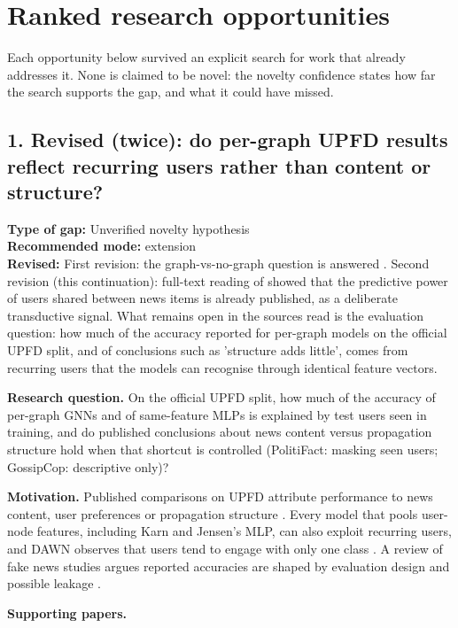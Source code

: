 \documentclass[11pt,a4paper]{article}
\begin{document}
\section{Ranked research opportunities}

Each opportunity below survived an explicit search for work that already addresses it. None is claimed to be novel: the novelty confidence states how far the search supports the gap, and what it could have missed.

\subsection{1. Revised (twice): do per-graph UPFD results reflect recurring users rather than content or structure?}
\textbf{Type of gap:} Unverified novelty hypothesis\\
\textbf{Recommended mode:} extension\\
\textbf{Revised:} First revision: the graph-vs-no-graph question is answered \cite{karn2025structure,dou2021upfd}. Second revision (this continuation): full-text reading of \cite{jeong2022hgfnd} showed that the predictive power of users shared between news items is already published, as a deliberate transductive signal. What remains open in the sources read is the evaluation question: how much of the accuracy reported for per-graph models on the official UPFD split, and of conclusions such as 'structure adds little', comes from recurring users that the models can recognise through identical feature vectors.

\textbf{Research question.} On the official UPFD split, how much of the accuracy of per-graph GNNs and of same-feature MLPs is explained by test users seen in training, and do published conclusions about news content versus propagation structure hold when that shortcut is controlled (PolitiFact: masking seen users; GossipCop: descriptive only)?

\textbf{Motivation.} Published comparisons on UPFD attribute performance to news content, user preferences or propagation structure \cite{dou2021upfd,karn2025structure}. Every model that pools user-node features, including Karn and Jensen's MLP, can also exploit recurring users, and DAWN observes that users tend to engage with only one class \cite{kim2025dawn}. A review of fake news studies argues reported accuracies are shaped by evaluation design and possible leakage \cite{tuan2026review}.

\textbf{Supporting papers.} \cite{karn2025structure,kim2025dawn,jeong2022hgfnd,tuan2026review,platonov2023hetero}
\end{document}
